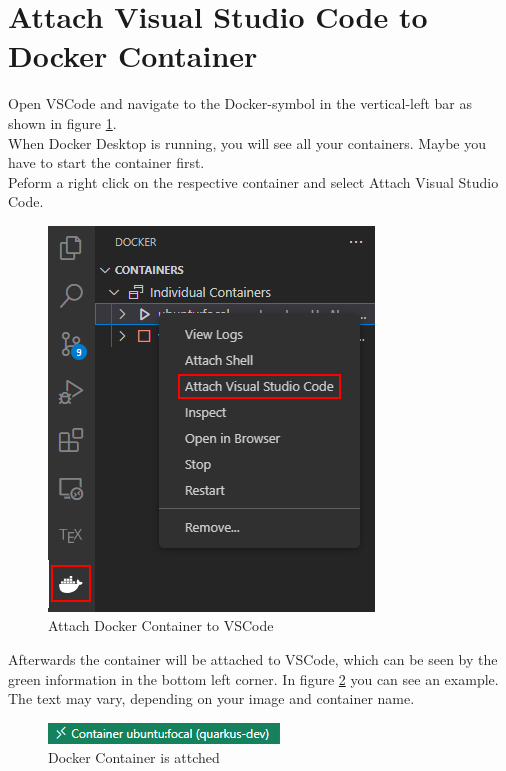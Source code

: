     \section{Attach Visual Studio Code to Docker Container}\label{sec:attach}
    Open VSCode and navigate to the Docker-symbol in the vertical-left bar as shown in figure \ref{fig:attach_vscode}. \\
    When Docker Desktop is running, you will see all your containers. Maybe you have to start the container first. \\
    Peform a right click on the respective container and select \glqq Attach Visual Studio Code\grqq. 
    \begin{figure}[h]
        \centering
        \includegraphics[scale=0.7]{images/attach_VSCode.png}
        \caption{Attach Docker Container to VSCode}
        \label{fig:attach_vscode}
    \end{figure}
    
    Afterwards the container will be attached to VSCode, which can be seen by the green information in the bottom left corner. In figure \ref{fig:container_attached} you can see an example. The text may vary, depending on your image and container name.     
    
    \begin{figure}[h]
        \centering
        \includegraphics{images/container_attached.png}
        \caption{Docker Container is attched}
        \label{fig:container_attached}
    \end{figure}

